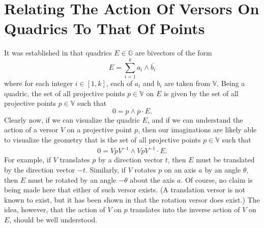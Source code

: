 \documentclass{birkjour}
\theoremstyle{definition}
\theoremstyle{remark}
\numberwithin{equation}{section}
\newcommand{\G}{\mathbb{G}}
\newcommand{\V}{\mathbb{V}}
\begin{document}
\section{Relating The Action Of Versors On Quadrics To That Of Points}

It was established in \cite{Parkin12} that quadrics $E\in\G$ are bivectors
of the form
\begin{equation}\label{equ_quadric_form}
E = \sum_{i=1}^k a_i\wedge\overline{b_i}
\end{equation}
where for each integer $i\in[1,k]$, each of $a_i$ and $b_i$ are
taken from $\V$.  Being a quadric, the set of all projective points
$p\in\V$ on $E$ is given by the set of all projective points $p\in\V$
such that
\begin{equation}\label{equ_quadric_representation}
0 = p\wedge\overline{p}\cdot E.
\end{equation}
Clearly now, if we can visualize the quadric $E$, and if we can understand the action
of a versor $V$ on a projective point $p$, then our imaginations are likely able
to visualize the geometry that is the set of all projective points $p\in\V$ such that
\begin{equation}\label{equ_quadric_transformed}
0 = VpV^{-1}\wedge\overline{VpV^{-1}}\cdot E.
\end{equation}
For example, if $V$ translates $p$ by a direction vector $t$, then $E$ must be
translated by the direction vector $-t$.  Similarly, if $V$ rotates $p$ on
an axis $a$ by an angle $\theta$, then $E$ must be rotated by an
angle $-\theta$ about the axis $a$.  Of course, no
claim is being made here that either of such versor exists.  (A translation
versor is not known to exist, but it has been shown in \cite{Parkin12} that the
rotation versor does exist.)  The idea, however,
that the action of $V$ on $p$ translates into the inverse
action of $V$ on $E$, should be well understood.
\end{document}
